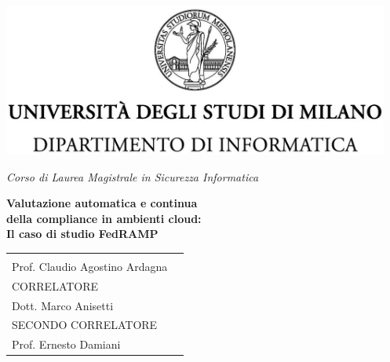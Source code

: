 \begin{titlepage}
  \begin{center}
    \includegraphics[height=5.0cm]{immagini/unimi.jpg}
    
    \vspace*{.4cm}
    {\Large 
      \emph{Corso di Laurea Magistrale in Sicurezza Informatica}
    }
    \vfill
    \begin{LARGE}
        \textbf{Valutazione automatica e continua\\della compliance in ambienti cloud:\\[0.2cm]Il caso di studio FedRAMP}
    \end{LARGE}
    
    \vfill
    \begin{minipage}{\linewidth}
      \begin{tabular}{l r}
        \begin{minipage}{.50\linewidth}
          \begin{flushleft}
            {\large
              RELATORE\\[.2cm]
              Prof. Claudio Agostino Ardagna \\[.6cm]
              CORRELATORE\\[.2cm]
              Dott. Marco Anisetti \\[.6cm]
              SECONDO CORRELATORE\\[.2cm]
              Prof. Ernesto Damiani
            }


\end{flushleft}
\end{minipage}
\end{tabular}
\end{minipage}
\end{center}
\end{titlepage}
